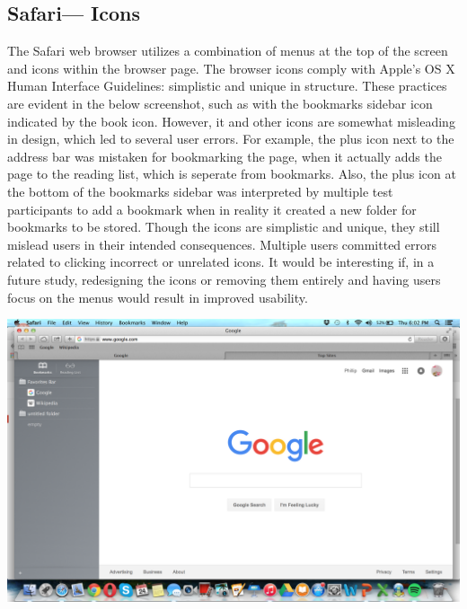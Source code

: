 \documentclass{article}
\begin{document}
\subsection{Safari--- Icons} The Safari web browser utilizes a combination of menus at the top of the screen and icons within the browser page. The browser icons comply with Apple's OS X Human Interface Guidelines: simplistic and unique in structure. These practices are evident in the below screenshot, such as with the bookmarks sidebar icon indicated by the book icon. However, it and other icons are somewhat misleading in design, which led to several user errors. For example, the plus icon next to the address bar was mistaken for bookmarking the page, when it actually adds the page to the reading list, which is seperate from bookmarks. \clearpage \noindent Also, the plus icon at the bottom of the bookmarks sidebar was interpreted by multiple test participants to add a bookmark when in reality it created a new folder for bookmarks to be stored. Though the icons are simplistic and unique, they still mislead users in their intended consequences. Multiple users committed errors related to clicking incorrect or unrelated icons. It would be interesting if, in a future study, redesigning the icons or removing them entirely and having users focus on the menus would result in improved usability.
\begin{center}
\includegraphics[width=1\textwidth]{Safari_Bookmark.png}
\end{center}
\end{document}
